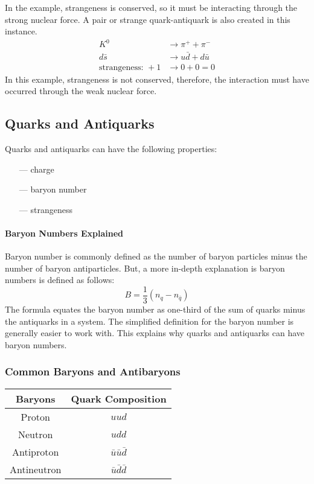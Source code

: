 \documentclass[10pt]{article}
\makeatletter
\newenvironment{tablehere}
  {\def\@captype{table}}
  {}
\makeatother
\begin{document}
\begin{multicols}{2}
	In the example, strangeness is conserved, so it must be interacting through the
	strong nuclear force. A pair or strange quark-antiquark is also created in this
	instance.
	\begin{align*}
		K^0                     & \longrightarrow \pi^+ + \pi^-       \\
		d\bar{s}                & \longrightarrow u\bar{d} + d\bar{u} \\
		\text{strangeness: } +1 & \longrightarrow 0 + 0 = 0
	\end{align*}
	In this example, strangeness is not conserved, therefore, the interaction must
	have occurred through the weak nuclear force.

	\subsection{Quarks and Antiquarks}
	Quarks and antiquarks can have the following properties:
	\medskip
	\begin{itemize}
		\item[---] charge
		\item[---] baryon number
		\item[---] strangeness
	\end{itemize}
	\paragraph{Baryon Numbers Explained}
	Baryon number is commonly defined as the number of baryon particles minus the
	number of baryon antiparticles. But, a more in-depth explanation is baryon
	numbers is defined as follows:
	\begin{equation}
		B = \dfrac{1}{3}(n_q - n_{\bar{q}})
	\end{equation}
	The formula equates the baryon number as one-third of the sum of quarks minus
	the antiquarks in a system. The simplified definition for the baryon number is
	generally easier to work with. This explains why quarks and antiquarks can have
	baryon numbers.

	\subsubsection{Common Baryons and Antibaryons}
	\begin{center}
		\begin{tablehere}
			\begin{tabular}{|c|c|}
				\hline
				Baryons     & Quark Composition       \\
				\hline
				Proton      & $uud$                   \\
				Neutron     & $udd$                   \\
				Antiproton  & $\bar{u}\bar{u}\bar{d}$ \\
				Antineutron & $\bar{u}\bar{d}\bar{d}$ \\
				\hline
			\end{tabular}
		\end{tablehere}
	\end{center}


\end{multicols}
\end{document}
